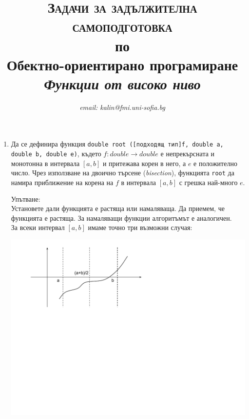 \documentclass[12pt,a4paper]{article}
\author{\textit{email: kalin@fmi.uni-sofia.bg}}
\title{\textsc{Задачи за задължителна самоподготовка} \\
по \\
Обектно-ориентирано програмиране\\
\textit{Функции от високо ниво}}
\newcommand{\code}[1]{\texttt{#1}}
\begin{document}
\maketitle


\begin{enumerate}


	\item Да се дефинира функция \code{double root ([подходящ тип]f, double a, double b, double e)}, където
	 $f:double \rightarrow double$ е непрекърсната и монотонна в интервала $[a,b]$ и притежава корен в него, а $e$ е положително число. Чрез използване на двоично търсене (\textit{bisection}), функцията \code{root} да намира приближение на корена на $f$ в интервала $[a,b]$ с грешка най-много $e$.

	\begin{mdframed}[hidealllines=true,backgroundcolor=gray!20]
	Упътване:\\

	Установете дали функцията е растяща или намаляваща. Да приемем, че функцията е растяща. За намаляващи функции алгоритъмът е аналогичен. \\

	За всеки интервал $[a,b]$ имаме точно три възможни случая:\\

	\begin{center}
	\includegraphics[width=14.0cm]{images/function}
	\end{center}

	\vspace{-180px}



\end{mdframed}
\end{enumerate}
\end{document}
